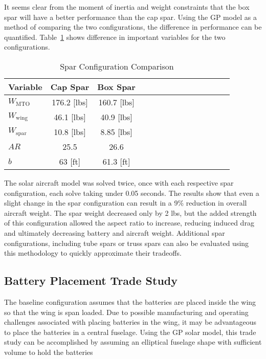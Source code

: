 \documentclass[]{aiaa-tc}%
\begin{document}
It seems clear from the moment of inertia and weight constraints that the box spar will have a better performance than the cap spar.  
Using the GP model as a method of comparing the two configurations, the difference in performance can be quantified. 
Table~\ref{t:spar} shows difference in important variables for the two configurations. 

\begin{longtable}{lccccccccccccc}
    \caption{Spar Configuration Comparison}\\
    \toprule
    \toprule
    \label{t:spar}
    Variable                & Cap Spar      & Box Spar      \\ \hline
    $W_{\mathrm{MTO}}$      & 176.2 [lbs]   &  160.7 [lbs]  \\
    $W_{\mathrm{wing}}$     & 46.1 [lbs]    & 40.9 [lbs]    \\
    $W_{\mathrm{spar}}$     & 10.8 [lbs]    & 8.85 [lbs]    \\
    $AR$                    & 25.5          & 26.6          \\
    $b$                     & 63 [ft]       &  61.3 [ft] \\
    \bottomrule
\end{longtable}

The solar aircraft model was solved twice, once with each respective spar configuration, each solve taking under 0.05 seconds.  
The results show that even a slight change in the spar configuration can result in a 9\% reduction in overall aircraft weight.  
The spar weight decreased only by 2 lbs, but the added strength of this configuration allowed the aspect ratio to increase, reducing induced drag and ultimately decreasing battery and aircraft weight.
Additional spar configurations, including tube spars or truss spars can also be evaluated using this methodology to quickly approximate their tradeoffs. 

\subsection{Battery Placement Trade Study}

The baseline configuration assumes that the batteries are placed inside the wing so that the wing is span loaded.  
Due to possible manufacturing and operating challenges associated with placing batteries in the wing, it may be advantageous to place the batteries in a central fuselage.  
Using the GP solar model, this trade study can be accomplished by assuming an elliptical fuselage shape with sufficient volume to hold the batteries
\end{document}
